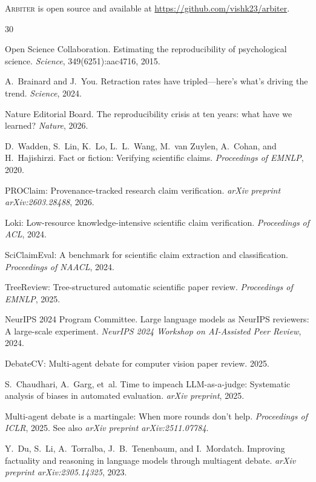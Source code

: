\documentclass[11pt]{article}
\newcommand{\arbiter}{\textsc{Arbiter}}
\begin{document}
\arbiter{} is open source and available at \url{https://github.com/vishk23/arbiter}.


\begin{thebibliography}{30}

Open Science Collaboration.
Estimating the reproducibility of psychological science.
\emph{Science}, 349(6251):aac4716, 2015.

A.~Brainard and J.~You.
Retraction rates have tripled---here's what's driving the trend.
\emph{Science}, 2024.

Nature Editorial Board.
The reproducibility crisis at ten years: what have we learned?
\emph{Nature}, 2026.

D.~Wadden, S.~Lin, K.~Lo, L.~L.~Wang, M.~van Zuylen, A.~Cohan, and H.~Hajishirzi.
Fact or fiction: Verifying scientific claims.
\emph{Proceedings of EMNLP}, 2020.

PROClaim: Provenance-tracked research claim verification.
\emph{arXiv preprint arXiv:2603.28488}, 2026.

Loki: Low-resource knowledge-intensive scientific claim verification.
\emph{Proceedings of ACL}, 2024.

SciClaimEval: A benchmark for scientific claim extraction and classification.
\emph{Proceedings of NAACL}, 2024.

TreeReview: Tree-structured automatic scientific paper review.
\emph{Proceedings of EMNLP}, 2025.

NeurIPS 2024 Program Committee.
Large language models as NeurIPS reviewers: A large-scale experiment.
\emph{NeurIPS 2024 Workshop on AI-Assisted Peer Review}, 2024.

DebateCV: Multi-agent debate for computer vision paper review.
2025.

S.~Chaudhari, A.~Garg, et~al.
Time to impeach LLM-as-a-judge: Systematic analysis of biases in automated evaluation.
\emph{arXiv preprint}, 2025.

Multi-agent debate is a martingale: When more rounds don't help.
\emph{Proceedings of ICLR}, 2025.
See also \emph{arXiv preprint arXiv:2511.07784}.

Y.~Du, S.~Li, A.~Torralba, J.~B.~Tenenbaum, and I.~Mordatch.
Improving factuality and reasoning in language models through multiagent debate.
\emph{arXiv preprint arXiv:2305.14325}, 2023.


\end{thebibliography}
\end{document}
